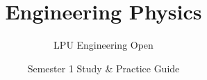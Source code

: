 \documentclass[a4paper,11pt,oneside,openany]{book}
\title{Engineering Physics}
\author{LPU Engineering Open}
\date{Semester 1 Study \& Practice Guide}
\begin{document}
\frontmatter

\makebookcover
\copyrightpage
\disclaimerpage

\tableofcontents
\newpage

\mainmatter







\end{document}
